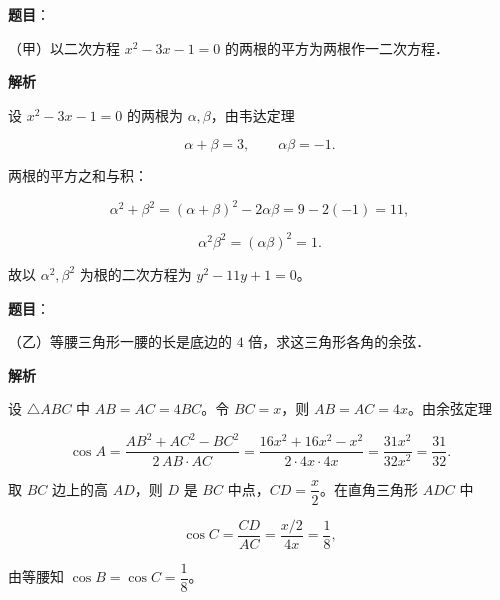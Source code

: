 
\begin{answer}

\textbf{题目}：

（甲）以二次方程 $x^2-3x-1=0$ 的两根的平方为两根作一二次方程．

\textbf{解析}

设 $x^2-3x-1=0$ 的两根为 $\alpha,\beta$，由韦达定理

\nopagebreak[4]
\[
\alpha+\beta=3,\qquad \alpha\beta=-1.
\]

两根的平方之和与积：

\nopagebreak[4]
\[
\alpha^2+\beta^2=(\alpha+\beta)^2-2\alpha\beta=9-2(-1)=11,
\]

\nopagebreak[4]
\[
\alpha^2\beta^2=(\alpha\beta)^2=1.
\]

故以 $\alpha^2,\beta^2$ 为根的二次方程为 $y^2-11y+1=0$。


\end{answer}
\begin{answer}

\textbf{题目}：

（乙）等腰三角形一腰的长是底边的 $4$ 倍，求这三角形各角的余弦．

\textbf{解析}

设 $\triangle ABC$ 中 $AB=AC=4BC$。令 $BC=x$，则 $AB=AC=4x$。由余弦定理

\nopagebreak[4]
\[
\cos A=\frac{AB^2+AC^2-BC^2}{2\,AB\cdot AC}
=\frac{16x^2+16x^2-x^2}{2\cdot4x\cdot4x}
=\frac{31x^2}{32x^2}=\frac{31}{32}.
\]

取 $BC$ 边上的高 $AD$，则 $D$ 是 $BC$ 中点，$CD=\dfrac x2$。在直角三角形 $ADC$ 中

\nopagebreak[4]
\[
\cos C=\frac{CD}{AC}=\frac{x/2}{4x}=\frac18,
\]

由等腰知 $\cos B=\cos C=\dfrac18$。


\end{answer}
